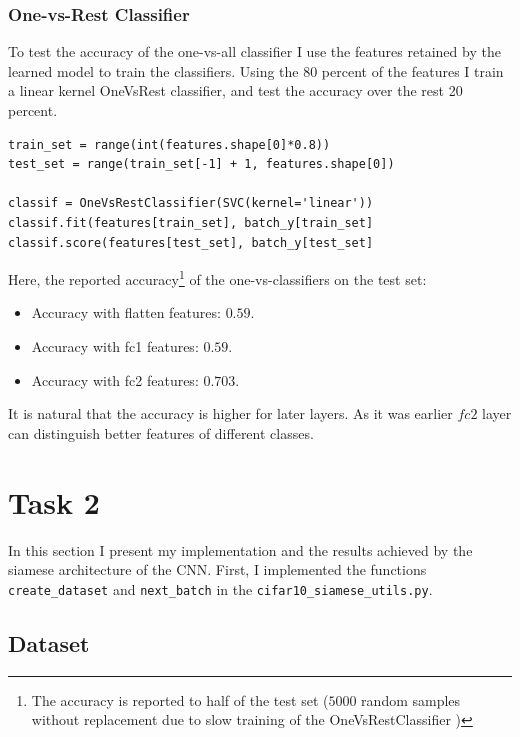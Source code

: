 \documentclass{article}
\begin{document}
\subsubsection{One-vs-Rest Classifier}


To test the accuracy of the one-vs-all classifier I use the features retained by the learned model to train the classifiers.
Using the 80 percent of the features I train a linear kernel OneVsRest classifier, and test the accuracy over the rest 20 percent.
\begin{verbatim}
train_set = range(int(features.shape[0]*0.8))
test_set = range(train_set[-1] + 1, features.shape[0])

classif = OneVsRestClassifier(SVC(kernel='linear'))
classif.fit(features[train_set], batch_y[train_set]
classif.score(features[test_set], batch_y[test_set]
\end{verbatim}
Here, the reported accuracy\footnote{The accuracy is reported to half of the test set ($5000$ random samples without replacement due to slow training of the OneVsRestClassifier		)} of the one-vs-classifiers on the test set:
\begin{itemize}
\item Accuracy with flatten features: $0.59$.
\item Accuracy with fc1 features: $0.59$.
\item Accuracy with fc2 features: $0.703$.
\end{itemize}
It is natural that the accuracy is higher for later layers.
As it was earlier $fc2$ layer can distinguish better features of different classes.




\section{Task 2}

In this section I present my implementation and the results achieved by the siamese architecture of the CNN.		
First, I implemented the functions \texttt{create\_dataset} and \texttt{next\_batch} in the \texttt{cifar10\_siamese\_utils.py}.


\subsection{Dataset}
\end{document}

